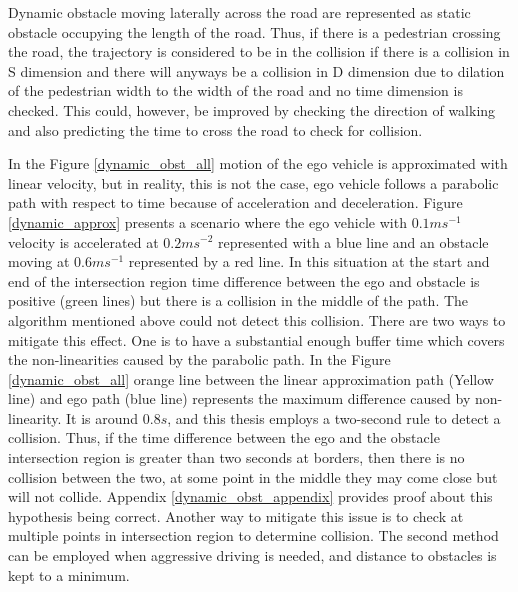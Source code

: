 Dynamic obstacle moving laterally across the road are represented as static obstacle occupying the length of the road. Thus, if there is a pedestrian crossing the road, the trajectory is considered to be in the collision if there is a collision in S dimension and there will anyways be a collision in D dimension due to dilation of the pedestrian width to the width of the road and no time dimension is checked. This could, however, be improved by checking the direction of walking and also predicting the time to cross the road to check for collision. 

In the Figure \ref{dynamic_obst_all} motion of the ego vehicle is approximated with linear velocity, but in reality, this is not the case, ego vehicle follows a parabolic path with respect to time because of acceleration and deceleration. Figure \ref{dynamic_approx} presents a scenario where the ego vehicle with $0.1ms^{-1}$ velocity is accelerated at $0.2ms^{-2}$ represented with a blue line and an obstacle moving at $0.6ms^{-1}$ represented by a red line. In this situation at the start and end of the intersection region time difference between the ego and obstacle is positive (green lines) but there is a collision in the middle of the path. The algorithm mentioned above could not detect this collision. There are two ways to mitigate this effect. One is to have a substantial enough buffer time which covers the non-linearities caused by the parabolic path. In the Figure \ref{dynamic_obst_all} orange line between the linear approximation path (Yellow line) and ego path (blue line) represents the maximum difference caused by non-linearity. It is around $0.8s$, and this thesis employs a two-second rule to detect a collision. Thus, if the time difference between the ego and the obstacle intersection region is greater than two seconds at borders, then there is no collision between the two, at some point in the middle they may come close but will not collide. Appendix \ref{dynamic_obst_appendix} provides proof about this hypothesis being correct. Another way to mitigate this issue is to check at multiple points in intersection region to determine collision. The second method can be employed when aggressive driving is needed, and distance to obstacles is kept to a minimum.

